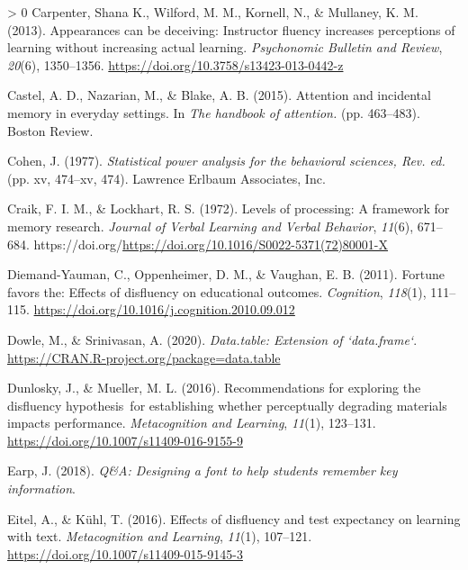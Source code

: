 \documentclass[
  english,
  jou]{apa7}
\newlength{\cslhangindent}
\newenvironment{CSLReferences}[3] %
 {%
  \setlength{\parindent}{0pt}
  \ifodd #1 \everypar{\setlength{\hangindent}{\cslhangindent}}\ignorespaces\fi
  \ifnum #2 > 0
  \setlength{\parskip}{#2\baselineskip}
  \fi
 }%
 {}
\begin{document}
\begin{CSLReferences}{1}{0}
\leavevmode\hypertarget{ref-Carpenter2013}{}%
Carpenter, Shana K., Wilford, M. M., Kornell, N., \& Mullaney, K. M. (2013). {Appearances can be deceiving: Instructor fluency increases perceptions of learning without increasing actual learning}. \emph{Psychonomic Bulletin and Review}, \emph{20}(6), 1350--1356. \url{https://doi.org/10.3758/s13423-013-0442-z}

\leavevmode\hypertarget{ref-Castel2015}{}%
Castel, A. D., Nazarian, M., \& Blake, A. B. (2015). {Attention and incidental memory in everyday settings.} In \emph{The handbook of attention.} (pp. 463--483). Boston Review.

\leavevmode\hypertarget{ref-Cohen1977}{}%
Cohen, J. (1977). \emph{{Statistical power analysis for the behavioral sciences, Rev. ed.}} (pp. xv, 474--xv, 474). Lawrence Erlbaum Associates, Inc.

\leavevmode\hypertarget{ref-Craik1972}{}%
Craik, F. I. M., \& Lockhart, R. S. (1972). {Levels of processing: A framework for memory research}. \emph{Journal of Verbal Learning and Verbal Behavior}, \emph{11}(6), 671--684. https://doi.org/\url{https://doi.org/10.1016/S0022-5371(72)80001-X}

\leavevmode\hypertarget{ref-Diemand-Yauman2011}{}%
Diemand-Yauman, C., Oppenheimer, D. M., \& Vaughan, E. B. (2011). {Fortune favors the: Effects of disfluency on educational outcomes}. \emph{Cognition}, \emph{118}(1), 111--115. \url{https://doi.org/10.1016/j.cognition.2010.09.012}

\leavevmode\hypertarget{ref-R-data.table}{}%
Dowle, M., \& Srinivasan, A. (2020). \emph{Data.table: Extension of `data.frame`}. \url{https://CRAN.R-project.org/package=data.table}

\leavevmode\hypertarget{ref-Dunlosky2016}{}%
Dunlosky, J., \& Mueller, M. L. (2016). {Recommendations for exploring the disfluency hypothesis~for establishing whether perceptually degrading materials impacts performance}. \emph{Metacognition and Learning}, \emph{11}(1), 123--131. \url{https://doi.org/10.1007/s11409-016-9155-9}

\leavevmode\hypertarget{ref-Earp2018}{}%
Earp, J. (2018). \emph{{Q{\&}A: Designing a font to help students remember key information}}.

\leavevmode\hypertarget{ref-Eitel2016}{}%
Eitel, A., \& Kühl, T. (2016). {Effects of disfluency and test expectancy on learning with text}. \emph{Metacognition and Learning}, \emph{11}(1), 107--121. \url{https://doi.org/10.1007/s11409-015-9145-3}


\end{CSLReferences}
\end{document}
